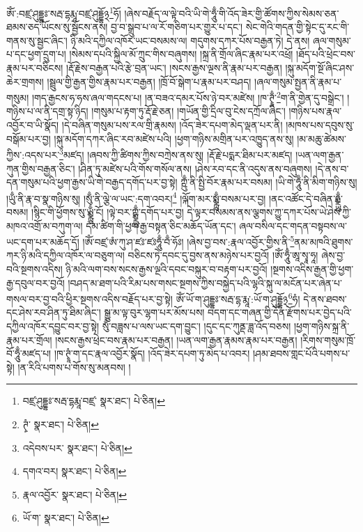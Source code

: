 ཨོཾ་:བཛྲ་ཤུདྡྷཿ་སརྦ་དྷརྨཱ་བཛྲ་ཤུདྡྷོ྅\footnote{བཛྲ་ཤུདྡྷཿ་སརྦ་དྷརྨཱ་བཛྲ་  སྣར་ཐང་།  པེ་ཅིན། }ཧོ། །ཞེས་བརྗོད་ལ་ལྟེ་བའི་ཡི་གེ་ཧཱུྃ་གི་འོད་ཟེར་གྱི་ཚོགས་ཀྱིས་སེམས་ཅན་ཐམས་ཅད་ཡོངས་སུ་སྦྱོངས་ནས། བྱ་བ་སྒྲུབ་པ་ལ་རོ་གཅིག་པར་གྱུར་པ་དང་། སེང་གེའི་གདན་གྱི་སྟེང་དུ་རང་གི་གནས་སུ་སྦྱང་ཞིང་། ཉི་མའི་དཀྱིལ་འཁོར་ཡང་བསམས་ལ། གདུགས་དཀར་པོས་བརྒྱན་ཏེ། དེ་ནས། ཞལ་གསུམ་པ་དང་ཕྱག་དྲུག་པ། །སེམས་དཔའི་སྐྱིལ་མོ་ཀྲུང་གིས་བཞུགས། །སྐྲ་ནི་གྲོལ་ཞིང་རྣམ་པར་འཕྲོ། །ཐོད་པའི་ཕྲེང་བས་རྣམ་པར་བཅིངས། །རྡོ་རྗེས་བརྒྱན་པའི་རྩེ་བྲན་ཡང་། །སངས་རྒྱས་ལྔས་ནི་རྣམ་པར་བརྒྱན། །སྐུ་མདོག་སྔོ་ཞིང་ཤས་ཆེར་གྲགས། །སྦྲུལ་གྱི་རྒྱན་གྱིས་རྣམ་པར་བརྒྱན། །ཁྲོ་བོ་སྒེག་པ་རྣམ་པར་བཤད། །ཞལ་གསུམ་སྤྱན་ནི་རྣམ་པ་གསུམ། །གད་རྒྱངས་ཧ་ཧས་ཞལ་གདངས་པ། །ན་བཟའ་དམར་པོས་ཉེ་བར་མཛེས། །ཁ་ཊྭཱྃ་\footnote{ཊྭཾ་  སྣར་ཐང་།  པེ་ཅིན། }ག་ནི་གྱེན་དུ་བསྒྲེང་། །གཉིས་པ་ལ་ནི་དགྲ་སྟ་ཉིད། །གསུམ་པ་རྟག་ཏུ་རྡོ་རྗེ་ཅན། །གཡོན་གྱི་དྲིལ་བུ་ངེས་དཀྲོལ་ཞིང་། །གཉིས་པས་རྣལ་འབྱོར་བ་ཡི་སྣོད། །དེ་བཞིན་གསུམ་པས་རལ་གྲི་རྣམས། །འོད་ཟེར་དཔག་མེད་ལྡན་པར་ནི། །མཁས་པས་དབུས་སུ་བསྒོམ་པར་བྱ། །སྐུ་མདོག་དཀར་ཞིང་རབ་མཛེས་པའི། །ཕྱག་གཉིས་མགྲིན་པར་འཁྱུད་ནས་སུ། །མ་མཆུ་ཚེམས་ཀྱིས་:འདས་པར་\footnote{འདེབས་པར་  སྣར་ཐང་།  པེ་ཅིན། }མཛད། །ཞབས་ཀྱི་ཚིགས་ཀྱིས་བཀྲེས་ནས་སུ། །རྡོ་རྗེ་པདྨར་ཐིམ་པར་མཛད། །ཡན་ལག་རྒྱན་ཀུན་གྱིས་བརྒྱན་ཅིང་། །ཤིན་ཏུ་མཛེས་པའི་གོས་གསོལ་ནས། །ཤེས་རབ་དང་ནི་འདུས་ནས་བཞུགས། །དེ་ནས་བ་དན་གསུམ་པའི་ཕྱག་རྒྱས་ཡི་གེ་བརྒྱད་དགོད་པར་བྱ་སྟེ། ཀྵུྃ་ནི་སྤྱི་བོར་རྣམ་པར་བསམ། །ཡི་གེ་ཧཱུྃ་ནི་མིག་གཉིས་སུ། །ཡུྃ་ནི་རྣ་བ་སྣ་གཉིས་སུ། །སུྃ་ནི་ལྕེ་ལ་ཡང་:དག་འབར།\footnote{དགའ་བར།  སྣར་ཐང་།  པེ་ཅིན། } །ལྐོག་མར་སྨྼྻུྃ་བསམ་པར་བྱ། །ནང་འཚོང་དེ་བཞིན་ཧྨྼྻུྃ་བསམ། །སྙིང་གི་ཕྱོགས་སུ་ཡྨྼྻུྃ་ངོ། །ལྟེ་བར་ཀྵྨྼྻུྃ་དགོད་པར་བྱ། དེ་ལྟར་བསམས་ནས་ལྕགས་ཀྱུ་དཀར་པོས་ཡེ་ཤེས་ཀྱི་མཁའ་འགྲོ་མ་བཀུག་ལ། དམ་ཚིག་གི་ཕྱག་རྒྱ་བསྟན་ཅིང་མཆོད་ཡོན་དང་། ཞལ་བསིལ་དང་གདན་བསྟབས་ལ་ཡང་དག་པར་མཆོད་དོ། །ཨོཾ་བཛྲ་ཨཾ་ཀུ་ཤ་ཛཿ་ཛཿཧཱུྃ་བྃ་ཧོཿ། །ཞེས་བྱ་བས་:རྣལ་འབྱོར་གྱིས་ནི་\footnote{རྣལ་འབྱོར་  སྣར་ཐང་།  པེ་ཅིན། }ནམ་མཁའི་ཐུགས་ཀར་ཉི་མའི་དཀྱིལ་འཁོར་ལ་བཅུག་ལ། བཅིངས་ཏེ་དབང་དུ་བྱས་ནས་མཉེས་པར་བྱའོ། །ཨོཾ་ཧཱུྃ་ཨཱ་སྭཱ་ཧཱ། ཞེས་བྱ་བའི་སྔགས་འདིས། ཉི་མའི་ལག་བས་སངས་རྒྱས་ལྔའི་དབང་བསྐུར་བ་བརྟག་པར་བྱའོ། །སྔགས་འདིས་རྒྱན་གྱི་ཕྱག་རྒྱ་དབུལ་བར་བྱའོ། །བཤད་མ་ཐག་པའི་རིམ་པས་གསང་སྔགས་ཀྱིས་བསྐྱེད་པའི་ལྷའི་སྐུ་ལ་མངོན་པར་ཞེན་པ་གསལ་བར་བྱ་བའི་ཕྱིར་སྔགས་འདིས་བརྗོད་པར་བྱ་སྟེ། ཨོཾ་ཡོ་ག་ཤུདྡྷཿ་སརྦ་དྷ་རྨཱ་:ཡོ་ག་ཤུདྡྷོ྅\footnote{ཡོ་ག་  སྣར་ཐང་།  པེ་ཅིན། }ཧཾ། དེ་ནས་ཐབས་དང་ཤེས་རབ་ཤིན་ཏུ་ཐིམ་ཞིང་། སྒྱུ་མ་ལྟ་བུར་ལྷག་པར་མོས་པས། བདག་དང་གཞན་གྱི་དོན་རྫོགས་པར་བྱེད་པའི་དཀྱིལ་འཁོར་དབྱུང་བར་བྱ་སྟེ། སུྃ་བཟླས་པ་ལས་ཡང་དག་བྱུང་། །དུང་དང་ཀུནྡ་ཟླ་འོད་བཅས། །ཕྱག་གཉིས་སྐྲ་ནི་རྣམ་པར་གྲོལ། །སངས་རྒྱས་ཕྲེང་བས་རྣམ་པར་བརྒྱན། །ཡན་ལག་རྒྱན་རྣམས་རྣམ་པར་བརྒྱན། །རིགས་གསུམ་ཁྲོ་བོ་ཧཱུྃ་མཛད་པ། །ཁ་ཊྭཱཾ་ག་དང་རྣལ་འབྱོར་སྣོད། །འོད་ཟེར་དཔག་ཏུ་མེད་པ་འབར། །ཤམ་ཐབས་གླང་པོའི་པགས་པ་སྟེ། །ན་རིའི་པགས་པ་གོས་སུ་མནབས། །
